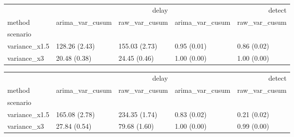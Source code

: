 \begin{tabular}{lllll}
\toprule
 & \multicolumn{2}{r}{delay} & \multicolumn{2}{r}{detect} \\
method & arima_var_cusum & raw_var_cusum & arima_var_cusum & raw_var_cusum \\
scenario &  &  &  &  \\
\midrule
variance_x1.5 & 128.26 (2.43) & 155.03 (2.73) & 0.95 (0.01) & 0.86 (0.02) \\
variance_x3 & 20.48 (0.38) & 24.45 (0.46) & 1.00 (0.00) & 1.00 (0.00) \\
\bottomrule
\end{tabular}

\begin{tabular}{lllll}
\toprule
 & \multicolumn{2}{r}{delay} & \multicolumn{2}{r}{detect} \\
method & arima_var_cusum & raw_var_cusum & arima_var_cusum & raw_var_cusum \\
scenario &  &  &  &  \\
\midrule
variance_x1.5 & 165.08 (2.78) & 234.35 (1.74) & 0.83 (0.02) & 0.21 (0.02) \\
variance_x3 & 27.84 (0.54) & 79.68 (1.60) & 1.00 (0.00) & 0.99 (0.00) \\
\bottomrule
\end{tabular}
